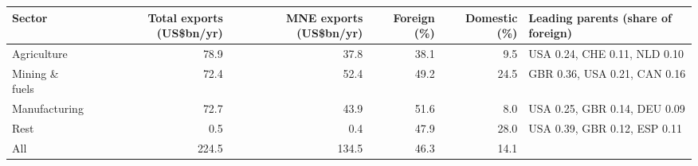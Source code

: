 \begin{tabular}{@{}l r r r r l@{}}
\toprule
Sector & Total exports (US\$bn/yr) & MNE exports (US\$bn/yr) & Foreign (\%) & Domestic (\%) & Leading parents (share of foreign) \\
\midrule
Agriculture & 78.9 & 37.8 & 38.1 & 9.5 & USA 0.24, CHE 0.11, NLD 0.10 \\
Mining \& fuels & 72.4 & 52.4 & 49.2 & 24.5 & GBR 0.36, USA 0.21, CAN 0.16 \\
Manufacturing & 72.7 & 43.9 & 51.6 & 8.0 & USA 0.25, GBR 0.14, DEU 0.09 \\
Rest & 0.5 & 0.4 & 47.9 & 28.0 & USA 0.39, GBR 0.12, ESP 0.11 \\
\midrule
All & 224.5 & 134.5 & 46.3 & 14.1 & \\
\bottomrule
\end{tabular}
